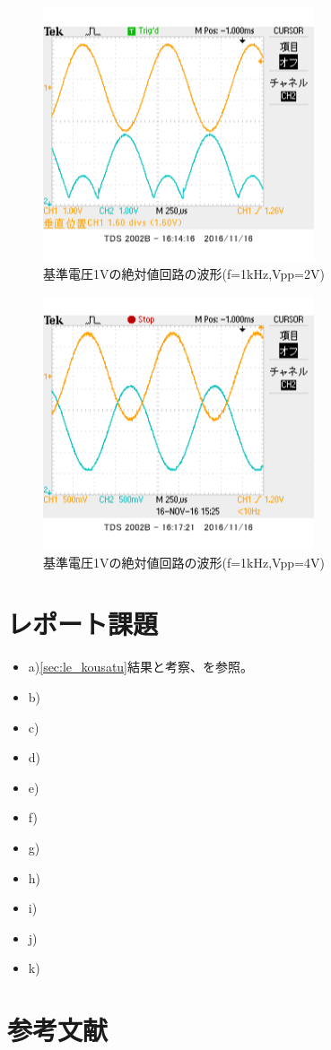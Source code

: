 \documentclass[11pt,a4j]{jsarticle}
\begin{document}
  \begin{figure}[htbp]
  \centering
  \includegraphics[width=8cm,clip]{2_abs_Vr1_f1V2sin_ViVo.png}
  \caption{基準電圧1Vの絶対値回路の波形(f=1kHz,Vpp=2V)}
  \label{fig:2_Vr1_2}
 \end{figure}%
  
  
  \begin{figure}[htbp]
  \centering
  \includegraphics[width=8cm,clip]{2_abs_Vr1_f1V4sin_ViVo.png}
  \caption{基準電圧1Vの絶対値回路の波形(f=1kHz,Vpp=4V)}
  \label{fig:2_Vr1_4}
 \end{figure}%
  
  
  \clearpage
  
 \section{レポート課題} 
  \begin{itemize}
  \item a)\ref{sec:le_kousatu}結果と考察、を参照。
  \item b)
  \item c)
  \item d)
  \item e)
  \item f)
  \item g)
  \item h)
  \item i)
  \item j)
  \item k)
  \end{itemize}
  
 \section{参考文献}
  
  
  
\end{document}
